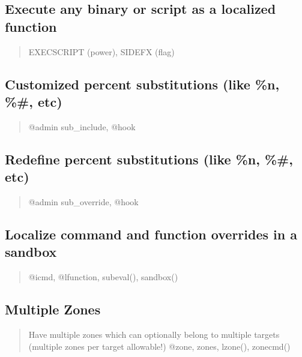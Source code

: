 \documentclass[letterpaper,10pt,english]{sphinxmanual}
\begin{document}
\subsection{Execute any binary or script as a localized function}
\label{\detokenize{features:execute-any-binary-or-script-as-a-localized-function}}\begin{quote}

\sphinxAtStartPar
EXECSCRIPT (power), SIDEFX (flag)
\end{quote}


\subsection{Customized percent substitutions (like \%n, \%\#, etc)}
\label{\detokenize{features:customized-percent-substitutions-like-n-etc}}\begin{quote}

\sphinxAtStartPar
@admin sub\_include, @hook
\end{quote}


\subsection{Redefine percent substitutions (like \%n, \%\#, etc)}
\label{\detokenize{features:redefine-percent-substitutions-like-n-etc}}\begin{quote}

\sphinxAtStartPar
@admin sub\_override, @hook
\end{quote}


\subsection{Localize command and function overrides in a sandbox}
\label{\detokenize{features:localize-command-and-function-overrides-in-a-sandbox}}\begin{quote}

\sphinxAtStartPar
@icmd, @lfunction, subeval(), sandbox()
\end{quote}


\subsection{Multiple Zones}
\label{\detokenize{features:multiple-zones}}\begin{quote}

\sphinxAtStartPar
Have multiple zones which can optionally belong to
multiple targets (multiple zones per target allowable!)
@zone, zones, lzone(), zonecmd()
\end{quote}
\end{document}
